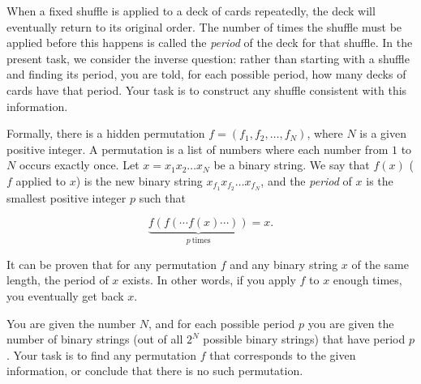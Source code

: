 

When a fixed shuffle is applied to a deck of cards repeatedly, the deck will eventually return to its original order. 
The number of times the shuffle must be applied before this happens is called the \textit{period} of the deck for that shuffle.
In the present task, we consider the inverse question: rather than starting with a shuffle and finding its period, 
you are told, for each possible period, how many decks of cards have that period. Your task is to construct any 
shuffle consistent with this information.

Formally, there is a hidden permutation $f = (f_1, f_2, \dots, f_N)$, where $N$ is a given positive integer. A permutation is a list of numbers where
each number from $1$ to $N$ occurs exactly once. Let $x = x_1x_2 \dots x_N$ be a binary string. We say that $f(x)$ ($f$ applied to $x$) is the new
binary string $x_{f_1}x_{f_2} \dots x_{f_N}$, and the \textit{period} of $x$ is the smallest positive integer $p$ such that 

$$\underbrace{f(f(\cdots f(x)\cdots))}_{p\ \text{times}} =  x.$$

It can be proven that for any permutation $f$ and any binary string $x$ of the same length, the period of $x$ exists. In other words, 
if you apply $f$ to $x$ enough times, you eventually get back $x$.

You are given the number $N$, and for each possible period $p$ you are given the number of binary strings 
 (out of all $2^N$ possible binary strings) that have period $p$. Your task is to find any permutation $f$ that corresponds to the given information, 
 or conclude that there is no such permutation.

